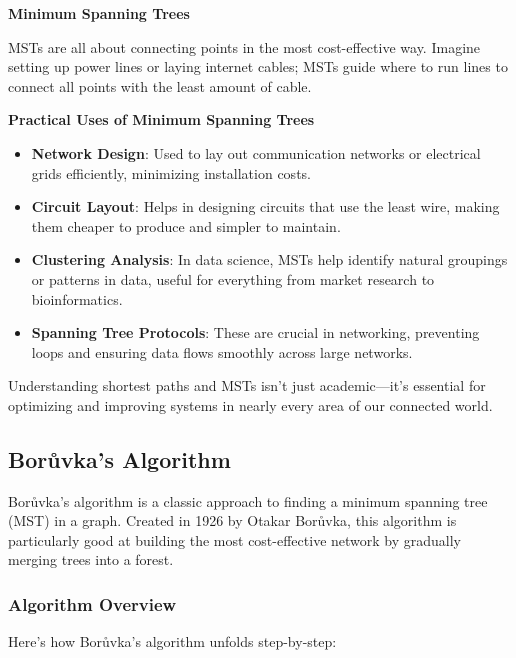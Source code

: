 \documentclass[12pt]{book} %
\begin{document}
\textbf{Minimum Spanning Trees}

MSTs are all about connecting points in the most cost-effective way. Imagine setting up power lines or laying internet cables; MSTs guide where to run lines to connect all points with the least amount of cable.

\textbf{Practical Uses of Minimum Spanning Trees}

\begin{itemize}
    \item \textbf{Network Design}: Used to lay out communication networks or electrical grids efficiently, minimizing installation costs.
    \item \textbf{Circuit Layout}: Helps in designing circuits that use the least wire, making them cheaper to produce and simpler to maintain.
    \item \textbf{Clustering Analysis}: In data science, MSTs help identify natural groupings or patterns in data, useful for everything from market research to bioinformatics.
    \item \textbf{Spanning Tree Protocols}: These are crucial in networking, preventing loops and ensuring data flows smoothly across large networks.
\end{itemize}

Understanding shortest paths and MSTs isn't just academic—it's essential for optimizing and improving systems in nearly every area of our connected world.

\subsection{Borůvka's Algorithm}

Borůvka's algorithm is a classic approach to finding a minimum spanning tree (MST) in a graph. Created in 1926 by Otakar Borůvka, this algorithm is particularly good at building the most cost-effective network by gradually merging trees into a forest.

\subsubsection{Algorithm Overview}

Here’s how Borůvka's algorithm unfolds step-by-step:
\end{document}
